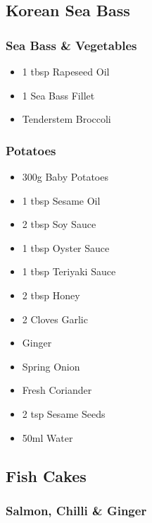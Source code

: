 \documentclass[11pt, english]{article}
\begin{document}
\newpage

	\subsection{Korean Sea Bass}

		\subsubsection*{Sea Bass \& Vegetables}
	
	\begin{itemize}
        \setlength\itemsep{0cm}
                \item 1 tbsp Rapeseed Oil
		\item 1 Sea Bass Fillet
		\item Tenderstem Broccoli
        \end{itemize}

		\subsubsection*{Potatoes}

	\begin{itemize}
        \setlength\itemsep{0cm}
                \item 300g Baby Potatoes
		\item 1 tbsp Sesame Oil
		\item 2 tbsp Soy Sauce
		\item 1 tbsp Oyster Sauce
		\item 1 tbsp Teriyaki Sauce
		\item 2 tbsp Honey
		\item 2 Cloves Garlic
		\item Ginger
		\item Spring Onion
		\item Fresh Coriander
		\item 2 tsp Sesame Seeds
		\item 50ml Water
        \end{itemize}

\newpage
	
	\subsection{Fish Cakes}

		\subsubsection*{Salmon, Chilli \& Ginger}
\end{document}
